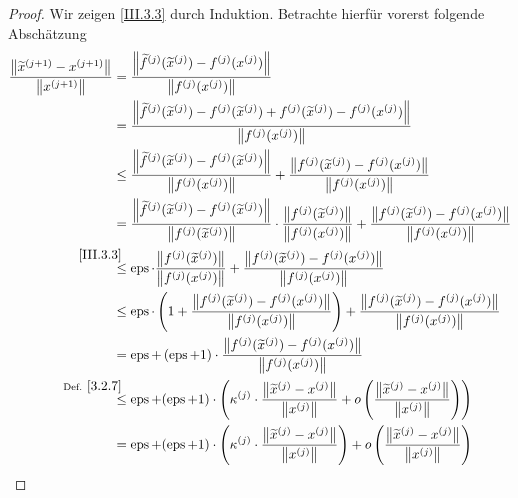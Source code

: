 \begin{Leme}[Fehlerfortpflanzung]
\begin{proof}
  Wir zeigen \ref{III.3.3} durch Induktion.
  Betrachte hierfür vorerst folgende Abschätzung
  \begin{align*}
    \frac{\nn[\widetilde{x}^{(j+1)}-x^{(j+1)}]}{\nn[x^{(j+1)}]}
    &= \frac{\nn[\widetilde{f}^{(j)}(\widetilde{x}^{(j)})-f^{(j)}(x^{(j)})]}
      {\nn[f^{(j)}(x^{(j)})]} \\
    &= \frac{\nn[\widetilde{f}^{(j)}(\widetilde{x}^{(j)})
      -f^{(j)}(\widetilde{x}^{(j)})
      +f^{(j)}(\widetilde{x}^{(j)})
      -f^{(j)}(x^{(j)})]}
      {\nn[f^{(j)}(x^{(j)})]} \\
    &\leq \frac{\nn[\widetilde{f}^{(j)}(\widetilde{x}^{(j)})
      -f^{(j)}(\widetilde{x}^{(j)})]}
      {\nn[f^{(j)}(x^{(j)})]}
      +\frac{\nn[f^{(j)}(\widetilde{x}^{(j)}) - f^{(j)}(x^{(j)})]}
      {\nn[f^{(j)}(x^{(j)})]} \\
    &= \frac{\nn[\widetilde{f}^{(j)}(\widetilde{x}^{(j)})
      -f^{(j)}(\widetilde{x}^{(j)})]}
      {\nn[f^{(j)}(\widetilde{x}^{(j)})]}
      \cdot \frac{\nn[f^{(j)}(\widetilde{x}^{(j)})]}
      {\nn[f^{(j)}(x^{(j)})]}
      +\frac{\nn[f^{(j)}(\widetilde{x}^{(j)}) - f^{(j)}(x^{(j)})]}
      {\nn[f^{(j)}(x^{(j)})]} \\
    &\overset{\mathllap{\ref{III.3.3}}}{\leq}
      \Eps\cdot \frac{\nn[f^{(j)}(\widetilde{x}^{(j)})]}
      {\nn[f^{(j)}(x^{(j)})]}
      +\frac{\nn[f^{(j)}(\widetilde{x}^{(j)})-f^{(j)}(x^{(j)})]}
      {\nn[f^{(j)}(x^{(j)})]} \\
    &\leq \Eps\cdot\left( 
      1 + \frac{\nn[f^{(j)}(\widetilde{x}^{(j)})-f^{(j)}(x^{(j)})]}
      {\nn[f^{(j)}(x^{(j)})]}
      \right)
      + \frac{\nn[f^{(j)}(\widetilde{x}^{(j)})-f^{(j)}(x^{(j)})]}
      {\nn[f^{(j)}(x^{(j)})]}\\
    &= \Eps + \left( \Eps+1 \right)
      \cdot \frac{\nn[f^{(j)}(\widetilde{x}^{(j)})-f^{(j)}(x^{(j)})]}
      {\nn[f^{(j)}(x^{(j)})]}\\      
    &\overset{\mathllap{\text{Def. }\ref{3.2.7}}}{\leq} 
      \Eps + (\Eps+1) \cdot
      \left(
      \kappa^{(j)}\cdot \frac{\nn[\widetilde{x}^{(j)}-x^{(j)}]}{\nn[x^{(j)}]}
      + o\left( 
      \frac{\nn[\widetilde{x}^{(j)}-x^{(j)}]}{\nn[x^{(j)}]}
      \right)
      \right)\\
    &= \Eps + (\Eps+1) \cdot
      \left(
      \kappa^{(j)}\cdot \frac{\nn[\widetilde{x}^{(j)}-x^{(j)}]}{\nn[x^{(j)}]}
      \right)
      + o\left( 
      \frac{\nn[\widetilde{x}^{(j)}-x^{(j)}]}{\nn[x^{(j)}]}
      \right)
  \end{align*}

\end{proof}
\end{Leme}
